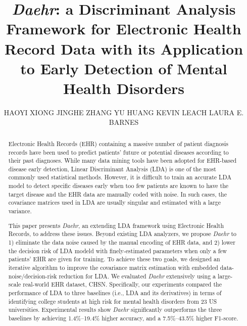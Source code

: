 \documentclass[prodmode,acmtist]{acmsmall}
\newcommand{\TheName}{\mbox{\emph{Daehr}}}
\begin{document}
\title{\TheName{}: a Discriminant Analysis Framework for Electronic Health Record Data  with its Application to Early Detection of Mental Health Disorders}

\author{
HAOYI XIONG
JINGHE ZHANG
YU HUANG
KEVIN LEACH
LAURA E. BARNES
}

\begin{abstract}
Electronic Health Records (EHR) containing a massive number of patient diagnosis records have been used to predict patients' future or potential diseases according to their past diagnoses.
While many data mining tools have been adopted for EHR-based disease early detection, Linear Discriminant Analysis (LDA) is one of the most commonly used statistical methods.
However, it is difficult to train an accurate LDA model to detect specific diseases early when too few patients are known to have the target disease and the EHR data are manually coded with noise.  In such cases, the covariance matrices used in LDA are usually singular and estimated with a large variance.
 
This paper presents \TheName{}, an extending LDA framework using Electronic Health Records, to address these issues.
Beyond existing LDA analyzers, we propose \TheName{} to 1) eliminate the data noise caused by the manual encoding of EHR data, and 2) lower the decision risk of LDA modeld with finely-estimated parameters when only a few patients' EHR are given for training.
To achieve these two goals, we designed an iterative algorithm to improve the covariance matrix estimation with embedded data-noise/decision-risk reduction for LDA.
We evaluated \TheName{} extensively using a large-scale real-world EHR dataset, CHSN.
Specifically, our experiments compared the performance of LDA to three baselines (i.e., LDA and its derivatives) in terms of identifying college students at high risk for mental health disorders from 23 US universities.
Experimental results show \TheName{} significantly outperforms the three baselines by achieving 1.4\%--19.4\% higher accuracy, and a 7.5\%--43.5\% higher F1-score.


\end{abstract}


\end{document}
